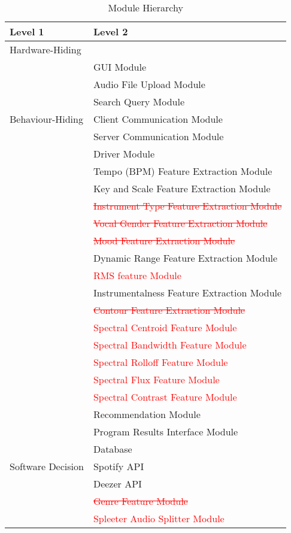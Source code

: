 \documentclass[12pt, titlepage]{article}
\begin{document}
\begin{table}[h!]
\centering
\begin{tabular}{p{} p{}}
\toprule
\textbf{Level 1} & \textbf{Level 2}\\
\midrule

{Hardware-Hiding} & ~ \\
\midrule

\multirow{7}{0.3\textwidth}{Behaviour-Hiding} & GUI Module\\
& Audio File Upload Module\\
& Search Query Module\\
& Client Communication Module\\
& Server Communication Module\\
& Driver Module\\
& Tempo (BPM) Feature Extraction Module\\
& Key and Scale Feature Extraction Module\\
& \textcolor{red}{\st{Instrument Type Feature Extraction Module}}\\
& \textcolor{red}{\st{Vocal Gender Feature Extraction Module}}\\
& \textcolor{red}{\st{Mood Feature Extraction Module}}\\
& Dynamic Range Feature Extraction Module\\
& \textcolor{red}{RMS feature Module}\\
& Instrumentalness Feature Extraction Module\\
& \textcolor{red}{\st{Contour Feature Extraction Module}}\\
& \textcolor{red}{Spectral Centroid Feature Module}\\
& \textcolor{red}{Spectral Bandwidth Feature Module}\\
& \textcolor{red}{Spectral Rolloff Feature Module}\\
& \textcolor{red}{Spectral Flux Feature Module}\\
& \textcolor{red}{Spectral Contrast Feature Module}\\
& Recommendation Module\\
& Program Results Interface Module\\
\midrule

\multirow{3}{0.3\textwidth}{Software Decision} & Database\\
& Spotify API\\
& Deezer API\\
& \textcolor{red}{\st{Genre Feature Module}}\\
& \textcolor{red}{Spleeter Audio Splitter Module}\\
\bottomrule

\end{tabular}
\caption{Module Hierarchy}
\label{TblMH}
\end{table}
\end{document}
